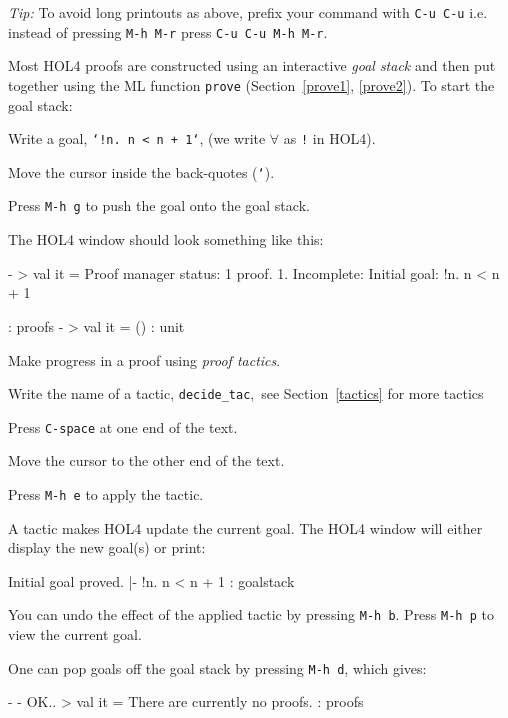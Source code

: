 \documentclass[a4paper,10pt]{article}
\begin{document}
\noindent\rule{0em}{1.5em}\emph{Tip:} To avoid long printouts as above, prefix your command with
{\tt C-u C-u} i.e. instead of pressing {\tt M-h M-r} press
{\tt C-u C-u M-h M-r}.


Most HOL4 proofs are constructed using an interactive \emph{goal
  stack} and then put together using the ML function {\tt prove}
(Section~\ref{prove1}, \ref{prove2}). To start the goal stack:
\begin{enum}
\item Write a goal, \eg{} {\tt `!n{.}~n < n + 1`}, (we write $\forall$ as {\tt !} in HOL4).
\item Move the cursor inside the back-quotes ({\tt `}).
\item Press {\tt M-h g} to push the goal onto the goal stack.
\end{enum}
The HOL4 window should look something like this:
\begin{code}
- > val it =
    Proof manager status: 1 proof.
    1. Incomplete:
         Initial goal:
         !n. n < n + 1

     : proofs
- > val it = () : unit
\end{code}


Make progress in a proof using \emph{proof tactics}.

\begin{enum}
\item Write the name of a tactic, \eg{} {\tt decide\_tac},~see Section~\ref{tactics} for more tactics
\item Press {\tt C-space} at one end of the text.
\item Move the cursor to the other end of the text.
\item Press {\tt M-h e} to apply the tactic.
\end{enum}
A tactic makes HOL4 update the current goal. The HOL4 window will either
display the new goal(s) or print:
\begin{code}
    Initial goal proved.
    |- !n. n < n + 1 : goalstack
\end{code}
You can undo the effect of the applied tactic by pressing {\tt M-h b}. Press {\tt M-h p} to view the current goal.


One can pop goals off the goal stack by pressing {\tt M-h d}, which gives:
\begin{code}
- - OK..
> val it = There are currently no proofs. : proofs
\end{code}
\end{document}

